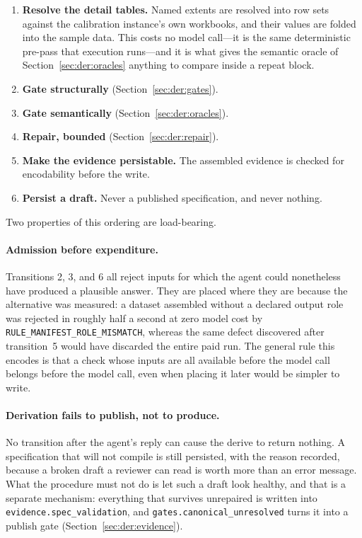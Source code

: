 \begin{enumerate}
    failures and disagreements are recorded, not assumed away.
  \item \textbf{Resolve the detail tables.} Named extents are resolved into row sets against
    the calibration instance's own workbooks, and their values are folded into the sample
    data. This costs no model call---it is the same deterministic pre-pass that execution
    runs---and it is what gives the semantic oracle of Section~\ref{sec:der:oracles} anything
    to compare inside a repeat block.
  \item \textbf{Gate structurally} (Section~\ref{sec:der:gates}).
  \item \textbf{Gate semantically} (Section~\ref{sec:der:oracles}).
  \item \textbf{Repair, bounded} (Section~\ref{sec:der:repair}).
  \item \textbf{Make the evidence persistable.} The assembled evidence is checked for
    encodability before the write.
  \item \textbf{Persist a draft.} Never a published specification, and never nothing.
\end{enumerate}

Two properties of this ordering are load-bearing.

\paragraph{Admission before expenditure.}
Transitions 2, 3, and 6 all reject inputs for which the agent could nonetheless have produced
a plausible answer. They are placed where they are because the alternative was measured: a
dataset assembled without a declared output role was rejected in roughly half a second at zero
model cost by \texttt{RULE\_MANIFEST\_ROLE\_MISMATCH}, whereas the same defect discovered after
transition~5 would have discarded the entire paid run. The general rule this encodes is that a
check whose inputs are all available before the model call belongs before the model call, even
when placing it later would be simpler to write.

\paragraph{Derivation fails to publish, not to produce.}
No transition after the agent's reply can cause the derive to return nothing. A specification
that will not compile is still persisted, with the reason recorded, because a broken draft a
reviewer can read is worth more than an error message. What the procedure must not do is let
such a draft look healthy, and that is a separate mechanism: everything that survives
unrepaired is written into \texttt{evidence.spec\_validation}, and
\texttt{gates.canonical\_unresolved} turns it into a publish gate
(Section~\ref{sec:der:evidence}).

